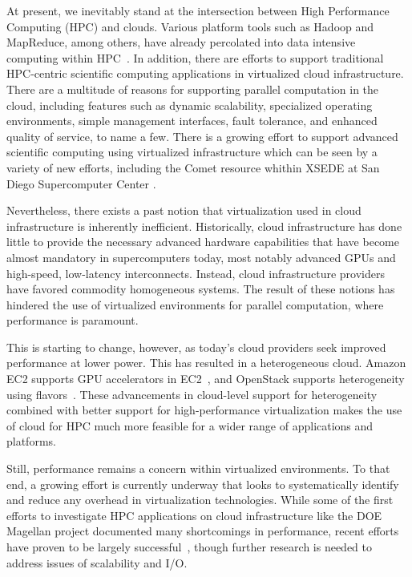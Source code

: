 \documentclass[10pt]{sigplanconf}
\begin{document}
At present, we inevitably stand at the intersection between High Performance Computing (HPC) and clouds. Various platform tools such as Hadoop and MapReduce, among others, have already percolated into data intensive computing within HPC~\cite{jha2014apache}.  In addition, there are efforts to support traditional HPC-centric scientific computing applications in virtualized cloud infrastructure.  There are a multitude of reasons for supporting parallel computation in the cloud\cite{Armbrust2010}, including features such as dynamic scalability, specialized operating environments, simple management interfaces, fault tolerance, and enhanced quality of service, to name a few. There is a growing effort to support advanced scientific computing using virtualized infrastructure which can be seen by a variety of new efforts, including the Comet resource whithin XSEDE at San Diego Supercomputer Center \cite{moore2014gateways}.  

Nevertheless, there exists a past notion that virtualization used in 
cloud infrastructure is inherently inefficient.  Historically, cloud
infrastructure has done little to provide the necessary advanced hardware
capabilities that have become almost mandatory in supercomputers today, most
notably advanced GPUs and high-speed, low-latency interconnects.  Instead, cloud
infrastructure providers have favored commodity homogeneous systems.  The result
of these notions has hindered the use of virtualized environments for parallel
computation, where performance is paramount.

This is starting to change, however, as today's cloud providers seek improved
performance at lower power.  This has resulted in a heterogeneous cloud.
Amazon EC2 supports GPU accelerators in EC2~\cite{www-amazon-gpu}, and
OpenStack supports heterogeneity using flavors~\cite{www-openstack-flavors}.
These advancements in cloud-level support for heterogeneity combined with better
support for high-performance virtualization makes the use of cloud for HPC much
more feasible for a wider range of applications and platforms.

Still, performance remains a concern within virtualized environments.  To that
end, a growing effort is currently underway that looks to systematically identify and
reduce any overhead in virtualization technologies.  While some of the first efforts to investigate HPC applications on cloud infrastructure like the DOE Magellan project \cite{yelick2011magellan} documented many shortcomings in performance, recent efforts have proven to be largely successful~\cite{Younge2011cloud, Luszczek:2011:EHC}, though further research is needed to address
issues of scalability and I/O.  
\end{document}
